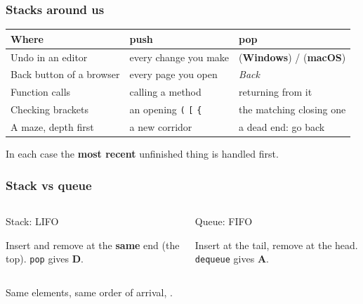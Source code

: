 \documentclass[aspectratio=169,10pt,compress]{beamer}
\newcommand{\win}{\textbf{Windows}}
\newcommand{\mac}{\textbf{macOS}}
\begin{document}
\begin{frame}[t,fragile] \frametitle{Stacks around us}
  \begin{center}\small
  \begin{tabular}{L{0.26\textwidth}L{0.3\textwidth}L{0.34\textwidth}}
    \toprule
    \textbf{Where}           & \textbf{push}                 & \textbf{pop} \\
    \midrule
    Undo in an editor        & every change you make         &  (\win) /  (\mac) \\
    Back button of a browser & every page you open           & \emph{Back} \\
    Function calls           & calling a method              & returning from it \\
    Checking brackets        & an opening \texttt{(} \texttt{[} \texttt{\{} & the matching closing one \\
    A maze, depth first      & a new corridor                & a dead end: go back \\
    \bottomrule
  \end{tabular}
  \end{center}
  \vspace{0.5em}
  In each case the \textbf{most recent} unfinished thing is handled first.
\end{frame}




\begin{frame}[t,fragile] \frametitle{Stack vs queue}
  \begin{columns}[T]
    \begin{column}{0.48\textwidth}
      \begin{block}{Stack: LIFO}
        \begin{center}
        \end{center}
        \small Insert and remove at the \textbf{same} end (the top). \texttt{pop} gives \textbf{D}.
      \end{block}
    \end{column}
    \begin{column}{0.48\textwidth}
      \begin{block}{Queue: FIFO}
        \begin{center}
        \end{center}
        \small Insert at the tail, remove at the head. \texttt{dequeue} gives \textbf{A}.
      \end{block}
    \end{column}
  \end{columns}
  \vspace{0.5em}
  \small Same elements, same order of arrival, .
\end{frame}
\end{document}
